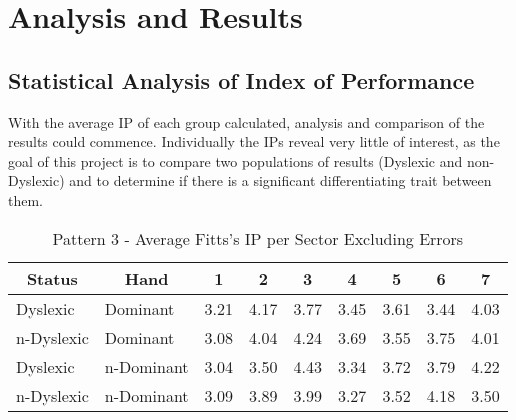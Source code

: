 \section{Analysis and Results}
	\subsection{Statistical Analysis of Index of Performance}
		With the average IP of each group calculated, analysis and comparison of the results could  commence. Individually the IPs reveal very little of interest, as the goal of this project is to compare two populations of results (Dyslexic and non-Dyslexic) and to determine if there is a significant differentiating trait between them.
		
	\begin{table}[h]
		\centering
		\caption{Pattern 3 - Average Fitts's IP per Sector Excluding Errors}
		\label{tab_pat_3_ip}
		\begin{tabularx}{\textwidth}{|l|l|X|X|X|X|X|X|X|}
			\hline
			\multicolumn{1}{|c|}{\textbf{Status}} & \multicolumn{1}{c|}{\textbf{Hand}} & \multicolumn{1}{c|}{\textbf{1}} & \multicolumn{1}{c|}{\textbf{2}} & \multicolumn{1}{c|}{\textbf{3}} & \multicolumn{1}{c|}{\textbf{4}} & \multicolumn{1}{c|}{\textbf{5}} & \multicolumn{1}{c|}{\textbf{6}} & \multicolumn{1}{c|}{\textbf{7}} \\ \hline
			Dyslexic                              & Dominant                           & 3.21       & 4.17       & 3.77       & 3.45       & 3.61       & 3.44       & 4.03       \\ \hline
			n-Dyslexic                          & Dominant                           & 3.08       & 4.04       & 4.24       & 3.69       & 3.55       & 3.75       & 4.01       \\ \hline
			Dyslexic                              & n-Dominant                       & 3.04       & 3.50       & 4.43       & 3.34       & 3.72       & 3.79       & 4.22       \\ \hline
			n-Dyslexic                          & n-Dominant                       & 3.09       & 3.89       & 3.99       & 3.27       & 3.52       & 4.18       & 3.50       \\ \hline
		\end{tabularx}
		\end{table}
		
